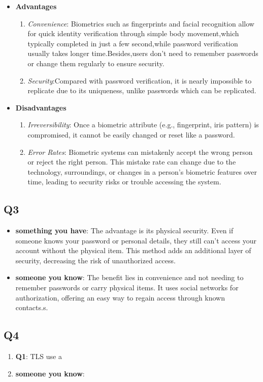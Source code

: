 \documentclass{article}
\begin{document}
	\begin{itemize}
		\item \textbf{Advantages}
		\begin{enumerate}
			\item \textit{Convenience}: Biometrics such as fingerprints and facial recognition allow for quick identity verification through simple body movement,which typically completed in just a few second,while password verification usually takes longer time.Besides,users don't need to remember passwords or change them regularly to ensure security.

			\item \textit{Security}:Compared with password verification, it is nearly impossible to replicate due to its uniqueness, unlike passwords which can be replicated.
		\end{enumerate}

		\item \textbf{Disadvantages}
		\begin{enumerate}
			\item \textit{Irreversibility}: Once a biometric attribute (e.g., fingerprint, iris pattern) is compromised, it cannot be easily changed or reset like a password.
			\item \textit{Error Rates}: Biometric systems can mistakenly accept the wrong person or reject the right person. This mistake rate can change due to the technology, surroundings, or changes in a person's biometric features over time, leading to security risks or trouble accessing the system\cite{o2003comparing}.
		\end{enumerate}


	\end{itemize}


\subsection{Q3}

	\begin{itemize}
		\item \textbf{something you have}: 
		The advantage is its physical security. Even if someone knows your password or personal details, they still can't access your account without the physical item. This method adds an additional layer of security, decreasing the risk of unauthorized access.

		\item \textbf{someone you know}:
		The benefit lies in convenience and not needing to remember passwords or carry physical items. It uses social networks for authorization, offering an easy way to regain access through known contacts.s.

	\end{itemize}

\subsection{Q4}

	\begin{enumerate}
		\item \textbf{Q1}: TLS use a 

		\item \textbf{someone you know}:
	\end{enumerate}



\end{document}
